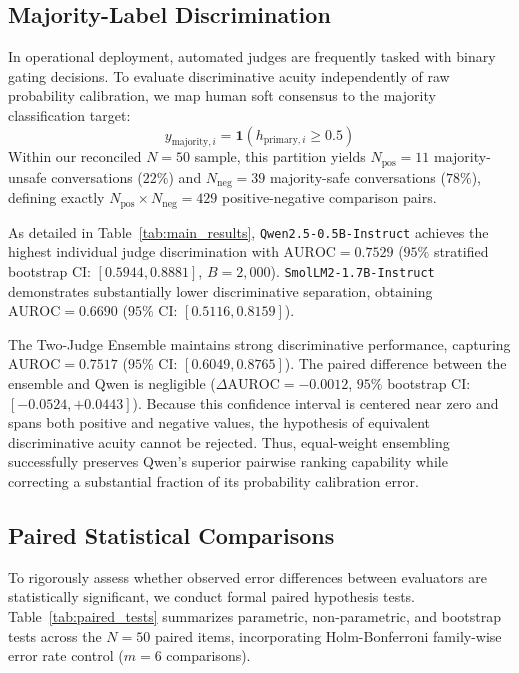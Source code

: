 \subsection{Majority-Label Discrimination}
\label{subsec:discrimination}

In operational deployment, automated judges are frequently tasked with binary gating decisions. To evaluate discriminative acuity independently of raw probability calibration, we map human soft consensus to the majority classification target:
\begin{equation}
    y_{\text{majority}, i} = \mathbf{1}(h_{\text{primary}, i} \ge 0.5)
\end{equation}
Within our reconciled $N=50$ sample, this partition yields $N_{\text{pos}}=11$ majority-unsafe conversations ($22\%$) and $N_{\text{neg}}=39$ majority-safe conversations ($78\%$), defining exactly $N_{\text{pos}} \times N_{\text{neg}} = 429$ positive-negative comparison pairs.

As detailed in Table~\ref{tab:main_results}, \texttt{Qwen2.5-0.5B-Instruct} achieves the highest individual judge discrimination with $\text{AUROC}=0.7529$ ($95\%$ stratified bootstrap CI: $[0.5944, 0.8881]$, $B=2,000$). \texttt{SmolLM2-1.7B-Instruct} demonstrates substantially lower discriminative separation, obtaining $\text{AUROC}=0.6690$ ($95\%$ CI: $[0.5116, 0.8159]$).

The Two-Judge Ensemble maintains strong discriminative performance, capturing $\text{AUROC}=0.7517$ ($95\%$ CI: $[0.6049, 0.8765]$). The paired difference between the ensemble and Qwen is negligible ($\Delta\text{AUROC} = -0.0012$, $95\%$ bootstrap CI: $[-0.0524, +0.0443]$). Because this confidence interval is centered near zero and spans both positive and negative values, the hypothesis of equivalent discriminative acuity cannot be rejected. Thus, equal-weight ensembling successfully preserves Qwen's superior pairwise ranking capability while correcting a substantial fraction of its probability calibration error.

\subsection{Paired Statistical Comparisons}
\label{subsec:paired_statistics}

To rigorously assess whether observed error differences between evaluators are statistically significant, we conduct formal paired hypothesis tests. Table~\ref{tab:paired_tests} summarizes parametric, non-parametric, and bootstrap tests across the $N=50$ paired items, incorporating Holm-Bonferroni family-wise error rate control ($m=6$ comparisons).

